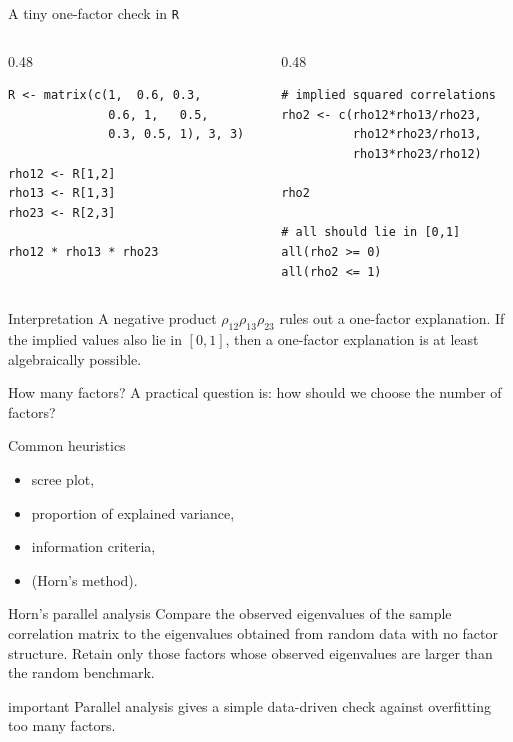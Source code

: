 \documentclass[dvipsnames,aspectratio=169,handout]{beamer}
\begin{document}
\begin{frame}[fragile]{A tiny one-factor check in \texttt{R}}
\begin{columns}[T,onlytextwidth]
\begin{column}{0.48\textwidth}
\begin{lstlisting}
R <- matrix(c(1,  0.6, 0.3,
              0.6, 1,   0.5,
              0.3, 0.5, 1), 3, 3)

rho12 <- R[1,2]
rho13 <- R[1,3]
rho23 <- R[2,3]

rho12 * rho13 * rho23
\end{lstlisting}
\end{column}
\begin{column}{0.48\textwidth}
\begin{lstlisting}
# implied squared correlations
rho2 <- c(rho12*rho13/rho23,
          rho12*rho23/rho13,
          rho13*rho23/rho12)

rho2

# all should lie in [0,1]
all(rho2 >= 0)
all(rho2 <= 1)
\end{lstlisting}
\end{column}
\end{columns}

\begin{alertblock}{Interpretation}
A negative product $\rho_{12}\rho_{13}\rho_{23}$ rules out a one-factor explanation.
If the implied values also lie in $[0,1]$, then a one-factor explanation is at least algebraically possible.
\end{alertblock}
\end{frame}


\begin{frame}{How many factors?}
A practical question is: how should we choose the number of factors?

\begin{block}{Common heuristics}
\begin{itemize}
    \item scree plot,
    \item proportion of explained variance,
    \item information criteria,
    \item {} (Horn's method).
\end{itemize}
\end{block}

\begin{alertblock}{Horn's parallel analysis}
Compare the observed eigenvalues of the sample correlation matrix
to the eigenvalues obtained from random data with no factor structure.
Retain only those factors whose observed eigenvalues are larger than the random benchmark.
\end{alertblock}

\begin{beamercolorbox}[wd=\textwidth,sep=7pt,center,rounded=true,shadow=true]{important}
Parallel analysis gives a simple data-driven check against overfitting too many factors.
\end{beamercolorbox}
\end{frame}
\end{document}
